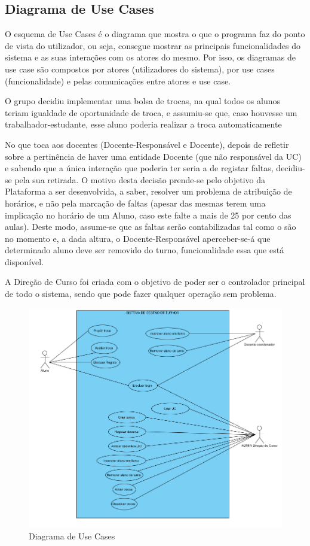 \documentclass[a4paper]{article}
\begin{document}
\clearpage
\subsection{Diagrama de Use Cases}
\hspace{3mm}O esquema de Use Cases é o diagrama que mostra o que o programa faz do ponto de vista do utilizador, ou seja, consegue mostrar as principais funcionalidades do sistema e as suas interações com os atores do mesmo. Por isso, os diagramas de use case são compostos por atores (utilizadores do sistema), por use cases (funcionalidade) e pelas comunicações entre atores e use case.

O grupo decidiu implementar uma bolsa de trocas, na qual todos os alunos teriam igualdade de oportunidade de troca, e assumiu-se que, caso houvesse um trabalhador-estudante, esse aluno poderia realizar a troca automaticamente

No que toca aos docentes (Docente-Responsável e Docente), depois de refletir sobre a pertinência de haver uma entidade Docente (que não responsável da UC) e sabendo que a única interação que poderia ter seria a de registar faltas, decidiu-se pela sua retirada. O motivo desta decisão prende-se pelo objetivo da Plataforma a ser desenvolvida, a saber, resolver um problema de atribuição de horários, e não pela marcação de faltas (apesar das mesmas terem uma implicação no horário de um Aluno, caso este falte a mais de 25 por cento das aulas). Deste modo, assume-se que as faltas serão contabilizadas tal como o são no momento e, a dada altura, o Docente-Responsável aperceber-se-á que determinado aluno deve ser removido do turno, funcionalidade essa que está disponível.

A Direção de Curso foi criada com o objetivo de poder ser o controlador principal de todo o sistema, sendo que pode fazer qualquer operação sem problema.

\begin{figure}[H]
\centering
\includegraphics[width=14cm]{usecases}
\caption{Diagrama de Use Cases}
\label{}
\end{figure}
\end{document}
